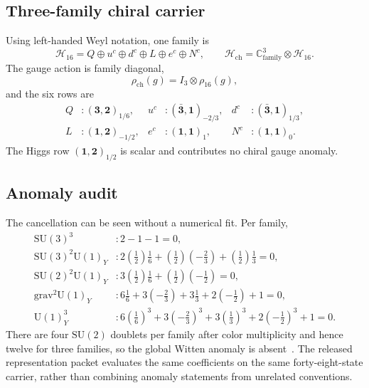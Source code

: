 \documentclass[11pt]{article}
\newcommand{\C}{\mathbb{C}}
\newcommand{\cH}{\mathcal{H}}
\newcommand{\SU}{\mathrm{SU}}
\newcommand{\U}{\mathrm{U}}
\begin{document}
\subsection{Three-family chiral carrier}

Using left-handed Weyl notation, one family is
\begin{equation}
\cH_{16}=Q\oplus u^c\oplus d^c\oplus L\oplus e^c\oplus N^c,
\qquad
\cH_{\mathrm{ch}}=\C^3_{\mathrm{family}}\otimes\cH_{16}.
\end{equation}
The gauge action is family diagonal,
\begin{equation}
\rho_{\mathrm{ch}}(g)=I_3\otimes\rho_{16}(g),
\end{equation}
and the six rows are
\begin{equation}
\begin{aligned}
Q&:(\mathbf3,\mathbf2)_{1/6},&
u^c&:(\bar{\mathbf3},\mathbf1)_{-2/3},&
d^c&:(\bar{\mathbf3},\mathbf1)_{1/3},\\
L&:(\mathbf1,\mathbf2)_{-1/2},&
e^c&:(\mathbf1,\mathbf1)_{1},&
N^c&:(\mathbf1,\mathbf1)_{0}.
\end{aligned}
\end{equation}
The Higgs row $(\mathbf1,\mathbf2)_{1/2}$ is scalar and contributes no chiral gauge anomaly.

\subsection{Anomaly audit}

The cancellation can be seen without a numerical fit.  Per family,
\begin{align}
\SU(3)^3 &: 2-1-1=0,\\
\SU(3)^2\U(1)_Y &: 2\left(\frac12\right)\frac16
 +\left(\frac12\right)\left(-\frac23\right)
 +\left(\frac12\right)\frac13=0,\\
\SU(2)^2\U(1)_Y &: 3\left(\frac12\right)\frac16
 +\left(\frac12\right)\left(-\frac12\right)=0,\\
\mathrm{grav}^2\U(1)_Y &: 6\frac16+3\left(-\frac23\right)
 +3\frac13+2\left(-\frac12\right)+1=0,\\
\U(1)_Y^3 &: 6\left(\frac16\right)^3+3\left(-\frac23\right)^3
 +3\left(\frac13\right)^3+2\left(-\frac12\right)^3+1=0.
\end{align}
There are four $\SU(2)$ doublets per family after color multiplicity and hence twelve for three
families, so the global Witten anomaly is absent~\cite{Witten1982}.  The released representation
packet evaluates the same coefficients on the same forty-eight-state carrier, rather than
combining anomaly statements from unrelated conventions.
\end{document}
